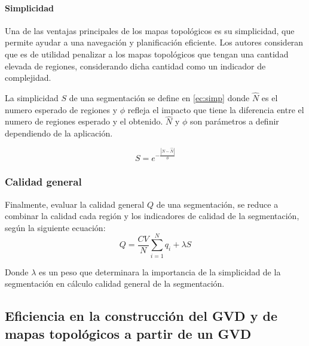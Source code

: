 \paragraph{Simplicidad}
Una de las ventajas principales de los mapas topológicos es su simplicidad, que permite ayudar a una navegación y planificación eficiente. Los autores consideran que es de utilidad penalizar a los mapas topológicos que tengan una cantidad elevada de regiones, considerando dicha cantidad como un indicador de complejidad. 

La simplicidad $S$ de una segmentación se define en \eqref{ec:simp} donde $\hat{N}$ es el numero esperado de regiones y $\phi$ refleja el impacto que tiene la diferencia entre el numero de regiones esperado y el obtenido. $\hat{N}$ y $\phi$ son parámetros a definir dependiendo de la aplicación.

\begin{equation}
  S=e^{-\frac{|N-\hat{N}|}{\phi}} \label{ec:simp}
\end{equation}


\subsubsection{Calidad general}
Finalmente, evaluar la calidad general $Q$ de una segmentación, se reduce a combinar la calidad cada región y los indicadores de calidad de la segmentación, según la siguiente ecuación:
\begin{equation}
Q=\frac{CV}{N}\sum^N_{i=1}{q_i+\lambda S}
\end{equation}

Donde $\lambda$ es un peso que determinara la importancia de la simplicidad de la segmentación en cálculo calidad general de la segmentación.


\subsection{Eficiencia en la construcción del GVD y de mapas topológicos a partir de un GVD}

